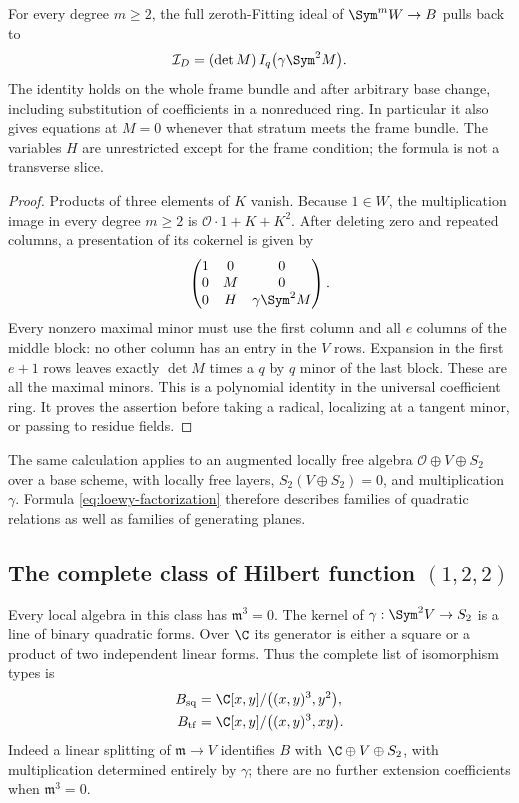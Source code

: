 \begin{theorem}
\label{thm:loewy-factorization}
For every degree $m\ge2$, the full zeroth-Fitting ideal of
$\Sym^m W\to B$ pulls back to
\begin{equation}\label{eq:loewy-factorization}
 \mathcal I_D=(\det M)\,I_q\bigl(\gamma\Sym^2M\bigr).
\end{equation}
The identity holds on the whole frame bundle and after arbitrary
base change, including substitution of coefficients in a nonreduced
ring. In particular it also gives equations at $M=0$ whenever that
stratum meets the frame bundle. The variables $H$ are unrestricted
except for the frame condition; the formula is not a transverse slice.
\end{theorem}
\begin{proof}
Products of three elements of $K$ vanish. Because $1\in W$, the
multiplication image in every degree $m\ge2$ is
$\mathcal O\cdot1+K+K^2$. After deleting zero and repeated columns,
a presentation of its cokernel is given by
\[
 \begin{pmatrix}
 1&0&0\\
 0&M&0\\
 0&H&\gamma\Sym^2M
 \end{pmatrix}.
\]
Every nonzero maximal minor must use the first column and all $e$
columns of the middle block: no other column has an entry in the
$V$ rows. Expansion in the first $e+1$ rows leaves exactly
$\det M$ times a $q$ by $q$ minor of the last block. These are all
the maximal minors. This is a polynomial identity in the universal
coefficient ring. It proves the assertion before taking a radical,
localizing at a tangent minor, or passing to residue fields.
\end{proof}

The same calculation applies to an augmented locally free algebra
$\mathcal O\oplus V\oplus S_2$ over a base scheme, with locally free
layers, $S_2(V\oplus S_2)=0$, and multiplication $\gamma$. Formula
\eqref{eq:loewy-factorization} therefore describes families of quadratic
relations as well as families of generating planes.

\subsection{The complete class of Hilbert function $(1,2,2)$}
Every local algebra in this class has $\mathfrak m^3=0$. The kernel
of $\gamma:\Sym^2V\to S_2$ is a line of binary quadratic forms.
Over $\C$ its generator is either a square or a product of two
independent linear forms. Thus the complete list of isomorphism types is
\begin{equation}\label{eq:loewy-two-types}
 \begin{split}
 B_{\mathrm{sq}}&=\C[x,y]/\bigl((x,y)^3,y^2\bigr),\\
 B_{\mathrm{tf}}&=\C[x,y]/\bigl((x,y)^3,xy\bigr).
 \end{split}
\end{equation}
Indeed a linear splitting of $\mathfrak m\to V$ identifies $B$ with
$\C\oplus V\oplus S_2$, with multiplication determined entirely by
$\gamma$; there are no further extension coefficients when
$\mathfrak m^3=0$.

